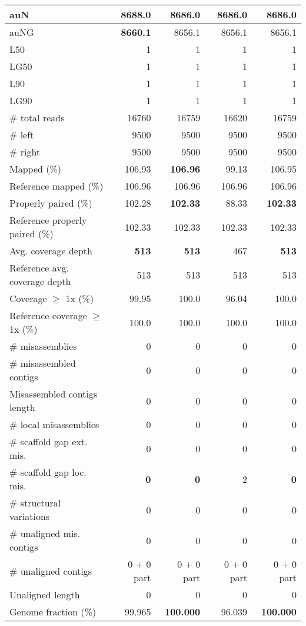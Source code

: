 \documentclass[12pt,a4paper]{article}
\begin{document}
\begin{table}[ht]
\begin{center}
\begin{tabular}{|l*{4}{|r}|}
auN & {\bf 8688.0} & 8686.0 & 8686.0 & 8686.0 \\ \hline
auNG & {\bf 8660.1} & 8656.1 & 8656.1 & 8656.1 \\ \hline
L50 & 1 & 1 & 1 & 1 \\ \hline
LG50 & 1 & 1 & 1 & 1 \\ \hline
L90 & 1 & 1 & 1 & 1 \\ \hline
LG90 & 1 & 1 & 1 & 1 \\ \hline
\# total reads & 16760 & 16759 & 16620 & 16759 \\ \hline
\# left & 9500 & 9500 & 9500 & 9500 \\ \hline
\# right & 9500 & 9500 & 9500 & 9500 \\ \hline
Mapped (\%) & 106.93 & {\bf 106.96} & 99.13 & 106.95 \\ \hline
Reference mapped (\%) & 106.96 & 106.96 & 106.96 & 106.96 \\ \hline
Properly paired (\%) & 102.28 & {\bf 102.33} & 88.33 & {\bf 102.33} \\ \hline
Reference properly paired (\%) & 102.33 & 102.33 & 102.33 & 102.33 \\ \hline
Avg. coverage depth & {\bf 513} & {\bf 513} & 467 & {\bf 513} \\ \hline
Reference avg. coverage depth & 513 & 513 & 513 & 513 \\ \hline
Coverage $\geq$ 1x (\%) & 99.95 & 100.0 & 96.04 & 100.0 \\ \hline
Reference coverage $\geq$ 1x (\%) & 100.0 & 100.0 & 100.0 & 100.0 \\ \hline
\# misassemblies & 0 & 0 & 0 & 0 \\ \hline
\# misassembled contigs & 0 & 0 & 0 & 0 \\ \hline
Misassembled contigs length & 0 & 0 & 0 & 0 \\ \hline
\# local misassemblies & 0 & 0 & 0 & 0 \\ \hline
\# scaffold gap ext. mis. & 0 & 0 & 0 & 0 \\ \hline
\# scaffold gap loc. mis. & {\bf 0} & {\bf 0} & 2 & {\bf 0} \\ \hline
\# structural variations & 0 & 0 & 0 & 0 \\ \hline
\# unaligned mis. contigs & 0 & 0 & 0 & 0 \\ \hline
\# unaligned contigs & 0 + 0 part & 0 + 0 part & 0 + 0 part & 0 + 0 part \\ \hline
Unaligned length & 0 & 0 & 0 & 0 \\ \hline
Genome fraction (\%) & 99.965 & {\bf 100.000} & 96.039 & {\bf 100.000} \\ \hline

\end{tabular}
\end{center}
\end{table}
\end{document}
